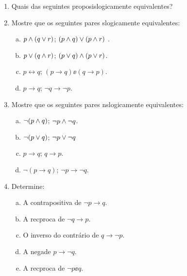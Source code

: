 \begin{enumerate}[{\bf 1.}]
\item Quais das seguintes proposi\coes s\ao logicamente equivalentes?
\begin{enumerate}[a)]
\end{enumerate}

\item Mostre que os seguintes pares s\ao logicamente equivalentes:
\begin{enumerate}[a)]
\item $p\wedge(q\vee r)$; $(p\wedge q)\vee(p\wedge r)$ .
\item $p\vee(q\wedge r)$; $(p\vee q)\wedge(p\vee r)$.
\item $p\leftrightarrow q$; $(p \to q)\ee(q \to p)$.
\item $p \to q$; $\lnot q \to \lnot p$.
\end{enumerate}

\item Mostre que os seguintes pares n\ao s\ao logicamente equivalentes:
\begin{enumerate}[a)]
\item $\lnot(p \wedge q)$; $\lnot p \wedge \lnot q$.
\item $\lnot(p \vee q)$; $\lnot p \vee \lnot q$
\item $p \to q$; $q \to p$.
\item $\lnot (p \to q)$; $\lnot p \to \lnot q$.
\end{enumerate}

\item Determine:
\begin{enumerate}[a)]
\item A contrapositiva de $\lnot p\to q$.
\item A rec\ih proca de $\lnot q \to p$.
\item O inverso do contr\'ario de $q \to \lnot p$.
\item A nega\cao de $p \to \lnot q$.
\item A rec\ih proca de $\lnot p \ee q$.
\end{enumerate}


\end{enumerate}
